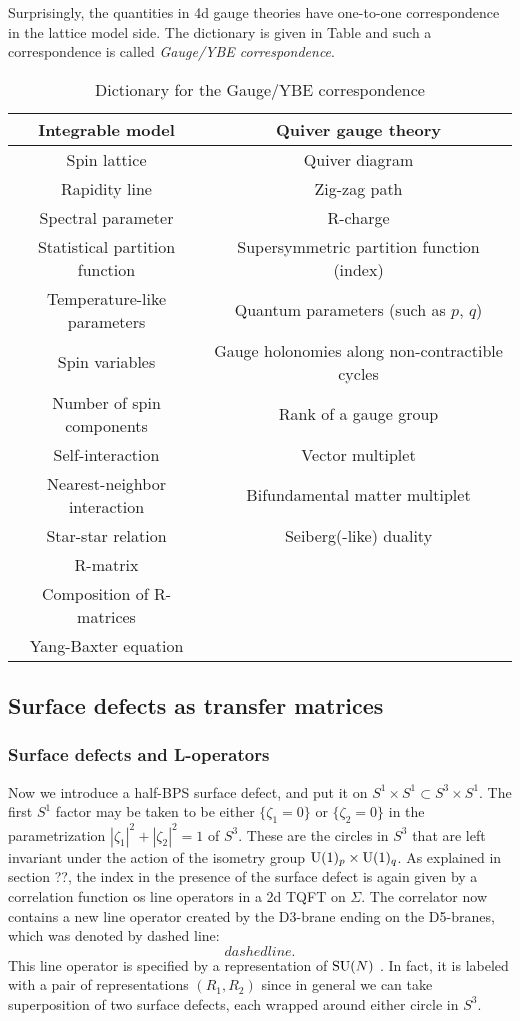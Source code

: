 Surprisingly, the quantities in 4d gauge theories have one-to-one
correspondence in the lattice model side. The dictionary is given
in Table and such a correspondence is called \emph{Gauge/YBE correspondence}.
\begin{table}
\caption{Dictionary for the Gauge/YBE correspondence}
\vspace{0.2cm}
  \centering
    \begin{tabular}{c|c}
Integrable model & Quiver gauge theory  \tabularnewline
\hline 
\hline 
Spin lattice            & Quiver diagram  \tabularnewline
Rapidity line          & Zig-zag path  \tabularnewline
Spectral parameter & R-charge  \tabularnewline
Statistical partition function    & Supersymmetric partition function (index)  \tabularnewline
Temperature-like parameters & Quantum parameters (such as $p,\,q$)  \tabularnewline
Spin variables       & Gauge holonomies along non-contractible cycles  \tabularnewline
Number of spin components  & Rank of a gauge group  \tabularnewline
Self-interaction    & Vector multiplet  \tabularnewline
Nearest-neighbor interaction & Bifundamental matter multiplet  \tabularnewline
Star-star relation  & Seiberg(-like) duality  \tabularnewline
R-matrix                  &                        \tabularnewline
Composition of R-matrices     &      \tabularnewline
Yang-Baxter equation &                \tabularnewline
    \end{tabular}
\end{table}



\subsection{Surface defects as transfer matrices}

\subsubsection{Surface defects and L-operators}

Now we introduce a half-BPS surface defect, and put it on $S^{1} \times S^{1} \subset S^{3} \times S^{1}$.
The first $S^{1}$ factor may be taken to be either $\{\zeta_{1}=0\}$
or $\{\zeta_{2}=0\}$ in the parametrization $\left|\zeta_{1}\right|^{2}+\left|\zeta_{2}\right|^{2}=1$
of $S^{3}$. These are the circles in $S^{3}$ that are left invariant
under the action of the isometry group $\mathrm{U}(1)_{p} \times \mathrm{U}(1)_{q}$.
As explained in section ??, the index in the presence of the surface
defect is again given by a correlation function os line operators
in a 2d TQFT on $\Sigma$. The correlator now contains a new line
operator created by the D3-brane ending on the D5-branes, which was
denoted by dashed line: 
\begin{equation}
dashedline.
\end{equation}
 This line operator is specified by a representation of $\mathrm{SU}(N)$ 
 \cite{Gukov:2006jk,Gukov:2008sn,Gadde:2013dda}. 
 In fact, it is labeled with a pair of representations
$(R_{1},R_{2})$ since in general we can take superposition of two
surface defects, each wrapped around either circle in $S^{3}$. 

